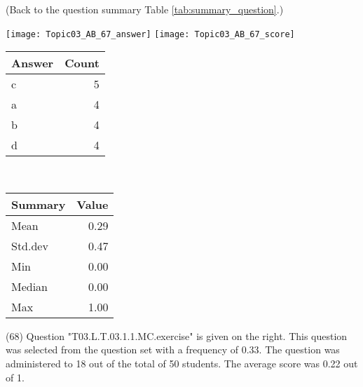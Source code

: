 \documentclass[12pt,english,nohyper]{tufte-handout}\usepackage[]{graphicx}\usepackage[]{color}
\begin{document}
 (Back to the question summary Table \ref{tab:summary_question}.)

\begin{center} \texttt{[image: Topic03\_AB\_67\_answer]} \texttt{[image: Topic03\_AB\_67\_score]} \end{center} 

\begin{center}%
\begin{tabular}{lr}
  \hline
Answer & Count \\ 
  \hline
c &   5 \\ 
  a &   4 \\ 
  b &   4 \\ 
  d &   4 \\ 
   \hline
\end{tabular}
~~~~~~~~%
\begin{tabular}{lr}
  \hline
Summary & Value \\ 
  \hline
Mean & 0.29 \\ 
  Std.dev & 0.47 \\ 
  Min & 0.00 \\ 
  Median & 0.00 \\ 
  Max & 1.00 \\ 
   \hline
\end{tabular}
\end{center}\newpage{} (68) Question "T03.L.T.03.1.1.MC.exercise" is given on the right. This question was selected from the question set with a frequency of 0.33. The question was administered to 18 out of the total of 50 students. The average score was 0.22 out of 1.
\end{document}
